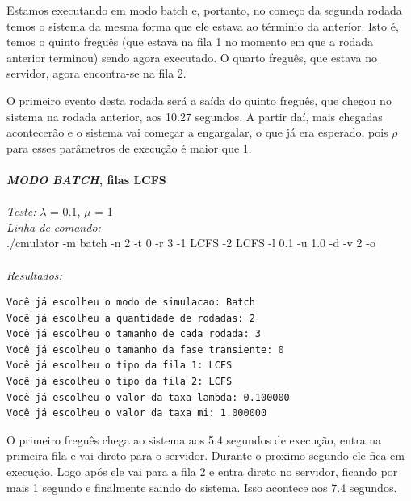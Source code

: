 \documentclass[a4paper,10pt]{article}
\begin{document}
    Estamos executando em modo batch e, portanto, no começo da segunda rodada temos o sistema da mesma forma que ele estava ao términio da anterior. Isto é, temos o quinto freguês (que estava na fila 1 no momento em que a rodada anterior terminou) sendo agora executado. O quarto freguês, que estava no servidor, agora encontra-se na fila 2.

    O primeiro evento desta rodada será a saída do quinto freguês, que chegou no sistema na rodada anterior, aos 10.27 segundos. A partir daí, mais chegadas acontecerão e o sistema vai começar a engargalar, o que já era esperado, pois $\rho$ para esses parâmetros de execução é maior que 1.
\\
\\
\textbf{\emph{MODO BATCH}, filas LCFS}
\\
\\
\emph{Teste:} $\lambda$ = 0.1, $\mu$ = 1
\\
\emph{Linha de comando:}
\\
./cmulator -m batch -n 2 -t 0 -r 3 -1 LCFS -2 LCFS -l 0.1 -u 1.0 -d -v 2 -o
\\
\\
\emph{Resultados:}
\\\begin{verbatim}
Você já escolheu o modo de simulacao: Batch
Você já escolheu a quantidade de rodadas: 2
Você já escolheu o tamanho de cada rodada: 3
Você já escolheu o tamanho da fase transiente: 0
Você já escolheu o tipo da fila 1: LCFS
Você já escolheu o tipo da fila 2: LCFS
Você já escolheu o valor da taxa lambda: 0.100000
Você já escolheu o valor da taxa mi: 1.000000
\end{verbatim}
    O primeiro freguês chega ao sistema aos 5.4 segundos de execução, entra na primeira fila e vai direto para o servidor. Durante o proximo segundo ele fica em execução. Logo após ele vai para a fila 2 e entra direto no servidor, ficando por mais 1 segundo e finalmente saindo do sistema. Isso acontece aos 7.4 segundos.
\end{document}
